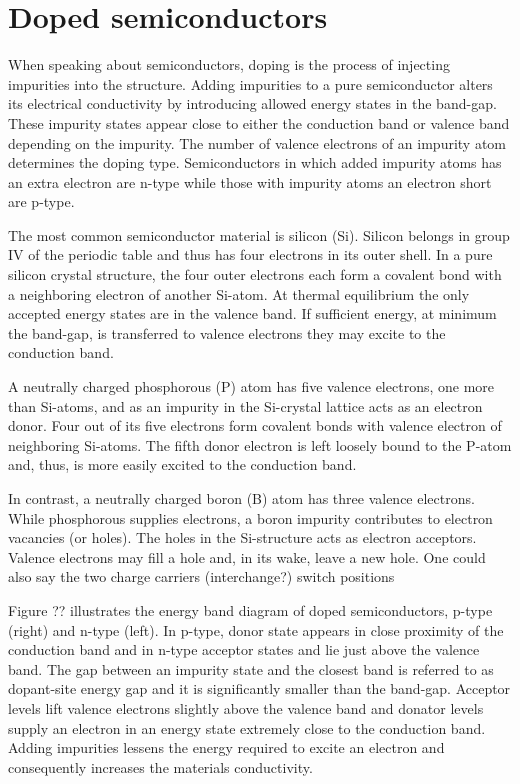 \section{Doped semiconductors}
When speaking about semiconductors, doping is the process of injecting impurities into the structure. Adding impurities to a pure semiconductor alters its electrical conductivity by introducing allowed energy states in the band-gap. These impurity states appear close to either the conduction band or valence band depending on the impurity. The number of valence electrons of an impurity atom determines the doping type. Semiconductors in which added impurity atoms has an extra electron are n-type while those with impurity atoms an electron short are p-type.

The most common semiconductor material is silicon (Si). Silicon belongs in group IV of the periodic table and thus has four electrons in its outer shell. In a pure silicon crystal structure, the four outer electrons each form a covalent bond with a neighboring electron of another Si-atom. At thermal equilibrium the only accepted energy states are in the valence band. If sufficient energy, at minimum the band-gap, is transferred to valence electrons they may excite to the conduction band.

A neutrally charged phosphorous (P) atom has five valence electrons, one more than Si-atoms, and as an impurity in the Si-crystal lattice acts as an electron donor. Four out of its five electrons form covalent bonds with valence electron of neighboring Si-atoms. The fifth donor electron is left loosely bound to the P-atom and, thus, is more easily excited to the conduction band.

In contrast, a neutrally charged boron (B) atom has three valence electrons. While phosphorous supplies electrons, a boron impurity contributes to electron vacancies (or holes). The holes in the Si-structure acts as electron acceptors. Valence electrons may fill a hole and, in its wake, leave a new hole. One could also say the two charge carriers (interchange?) switch positions

Figure ?? illustrates the energy band diagram of doped semiconductors, p-type (right) and n-type (left).
In p-type, donor state appears in close proximity of the conduction band and in n-type acceptor states and lie just above the valence band. The gap between an impurity state and the closest band is referred to as dopant-site energy gap and it is significantly smaller than the band-gap. Acceptor levels lift valence electrons slightly above the valence band and donator levels supply an electron in an energy state extremely close to the conduction band. Adding impurities lessens the energy required to excite an electron and consequently increases the materials conductivity.



